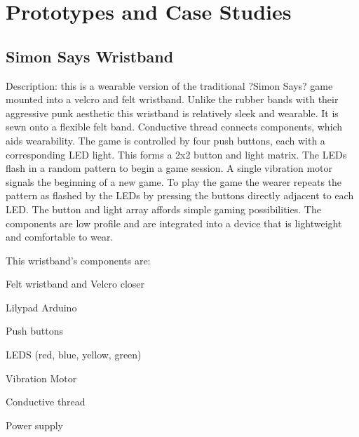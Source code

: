 \documentclass{chi-ext}
\begin{document}
\section{Prototypes and Case Studies}
\subsection{Simon Says Wristband}
Description: this is a wearable version of the traditional ?Simon Says? game mounted into a velcro and felt wristband. Unlike the rubber bands with their aggressive punk aesthetic this wristband is relatively sleek and wearable. It is sewn onto a flexible felt band. Conductive thread connects components, which aids wearability. The game is controlled by four push buttons, each with a corresponding LED light. This forms a 2x2 button and light matrix. The LEDs flash in a random pattern to begin a game session. A single vibration motor signals the beginning of a new game. To play the game the wearer repeats the pattern as flashed by the LEDs by pressing the buttons directly adjacent to each LED. The button and light array affords simple gaming possibilities. The components are low profile and are integrated into a device that is lightweight and comfortable to wear. 

This wristband's components are:
\begin{inparaenum}
\item Felt wristband and Velcro closer
\item Lilypad Arduino
\item Push buttons
\item LEDS (red, blue, yellow, green)
\item Vibration Motor
\item Conductive thread
\item Power supply
\end{inparaenum}
\end{document}
